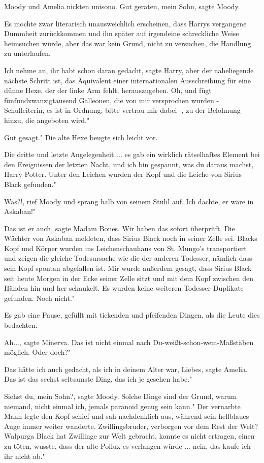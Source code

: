 Moody und Amelia nickten unisono. \glqq{}Gut geraten, mein Sohn\grqq{}, sagte
Moody.

Es mochte zwar literarisch unausweichlich erscheinen, dass Harrys vergangene
Dummheit zurückkommen und ihn später auf irgendeine schreckliche Weise
heimsuchen würde, aber das war kein Grund, nicht zu versuchen, die Handlung zu
unterlaufen.

\glqq{}Ich nehme an, ihr habt schon daran gedacht\grqq{}, sagte Harry, \glqq{}aber
der naheliegende nächste Schritt ist, das Äquivalent einer internationalen
Ausschreibung für eine dünne Hexe, der der linke Arm fehlt, herauszugeben. Oh,
und fügt fünfundzwanzigtausend Galleonen, die von mir versprochen wurden -
Schulleiterin, es ist in Ordnung, bitte vertrau mir dabei -, zu der Belohnung
hinzu, die angeboten wird."

\glqq{}Gut gesagt." Die alte Hexe beugte sich leicht vor.

\glqq{}Die dritte und letzte Angelegenheit ... es gab ein wirklich rätselhaftes
Element bei den Ereignissen der letzten Nacht, und ich bin gespannt, was du
daraus machst, Harry Potter. Unter den Leichen wurden der Kopf und die Leiche
von Sirius Black gefunden."

\glqq{}Was?!\grqq{}, rief Moody und sprang halb von seinem Stuhl auf. \glqq{}Ich
dachte, er wäre in Askaban!"

\glqq{}Das ist er auch\grqq{}, sagte Madam Bones. \glqq{}Wir haben das sofort
überprüft. Die Wächter von Askaban meldeten, dass Sirius Black noch in seiner
Zelle sei. Blacks Kopf und Körper wurden ins Leichenschauhaus von St. Mungo's
transportiert und zeigen die gleiche Todesursache wie die der anderen Todesser,
nämlich dass sein Kopf spontan abgefallen ist. Mir wurde außerdem gesagt, dass
Sirius Black seit heute Morgen in der Ecke seiner Zelle sitzt und mit dem Kopf
zwischen den Händen hin und her schaukelt. Es wurden keine weiteren
Todesser-Duplikate gefunden. Noch nicht."

Es gab eine Pause, gefüllt mit tickenden und pfeifenden Dingen, als die Leute
dies bedachten.

\glqq{}Ah...\grqq{}, sagte Minerva. \glqq{}Das ist nicht einmal nach
Du-weißt-schon-wem-Maßstäben möglich. Oder doch?"

\glqq{}Das hätte ich auch gedacht, als ich in deinem Alter war, Liebes\grqq{},
sagte Amelia. \glqq{}Das ist das sechst seltsamste Ding, das ich je gesehen
habe."

\glqq{}Siehst du, mein Sohn?\grqq{}, sagte Moody. \glqq{}Solche Dinge sind der
Grund, warum niemand, nicht einmal ich, jemals paranoid genug sein kann." Der
vernarbte Mann legte den Kopf schief und sah nachdenklich aus, während sein
hellblaues Auge immer weiter wanderte. \glqq{}Zwillingsbruder, verborgen vor dem
Rest der Welt? Walpurga Black hat Zwillinge zur Welt gebracht, konnte es nicht
ertragen, einen zu töten, wusste, dass der alte Pollux es verlangen würde ...
nein, das kaufe ich ihr nicht ab."

